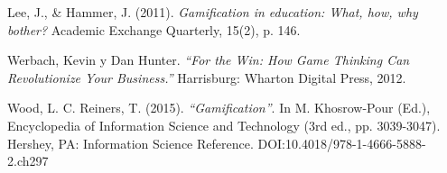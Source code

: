 \begin{thebibliography}{9}
        Lee, J., \& Hammer, J. (2011). 
        {\it Gamification in education: What, how, why bother?}
        Academic Exchange Quarterly, 15(2), p. 146.

        Werbach, Kevin y Dan Hunter.
        {\it ``For the Win: How Game Thinking Can Revolutionize Your Business.''}
        Harrisburg: Wharton Digital Press, 2012.

        Wood, L. C. Reiners, T. (2015).
        {\it ``Gamification''}. In M. Khosrow-Pour (Ed.), Encyclopedia of Information Science and Technology (3rd ed., pp. 3039-3047).
        Hershey, PA: Information Science Reference. DOI:10.4018/978-1-4666-5888-2.ch297
    

    





\end{thebibliography}

